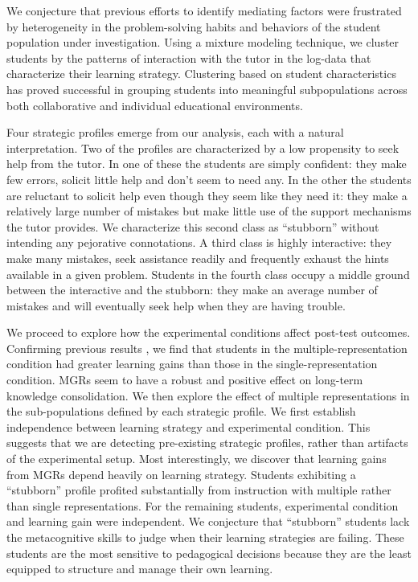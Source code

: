 \documentclass{edm_template}
\begin{document}
We conjecture that previous efforts to identify mediating factors were frustrated by heterogeneity in the problem-solving habits and behaviors of the student population under investigation. Using a mixture modeling technique, we cluster students by the patterns of interaction with the tutor in the log-data that characterize their learning strategy. Clustering based on student characteristics has proved successful in grouping students into meaningful subpopulations across both collaborative \cite{Perera2009} and individual \cite{Beal2008,Merceron2005,Amershi2009} educational environments. 

Four strategic profiles emerge from our analysis, each with a natural interpretation. Two of the profiles are characterized by a low propensity to seek help from the tutor. In one of these the students are simply confident: they make few errors, solicit little help and don't seem to need any. In the other the students are reluctant to solicit help even though they seem like they need it: they make a relatively large number of mistakes but make little use of the support mechanisms the tutor provides. We characterize this second class as ``stubborn'' without intending any pejorative connotations. A third class is highly interactive: they make many mistakes, seek assistance readily and frequently exhaust the hints available in a given problem. Students in the fourth class occupy a middle ground between the interactive and the stubborn: they make an average number of mistakes and will eventually seek help when they are having trouble.

We proceed to explore how the experimental conditions affect post-test outcomes. Confirming previous results \cite{Rau2012}, we find that students in the multiple-representation condition had greater learning gains than those in the single-representation condition. MGRs seem to have a robust and positive effect on long-term knowledge consolidation. We then explore the effect of multiple representations in the sub-populations defined by each strategic profile. We first establish independence between learning strategy and experimental condition. This suggests that we are detecting pre-existing strategic profiles, rather than artifacts of the experimental setup. Most interestingly, we discover that learning gains from MGRs depend heavily on learning strategy. Students exhibiting a ``stubborn'' profile profited substantially from instruction with multiple rather than single representations. For the remaining students, experimental condition and learning gain were independent. We conjecture that ``stubborn'' students lack the metacognitive skills to judge when their learning strategies are failing. These students are the most sensitive to pedagogical decisions because they are the least equipped to structure and manage their own learning. 
\end{document}
